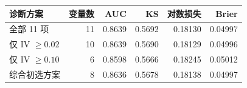 \begin{tabular}{lrrrrr}
\toprule
诊断方案 & 变量数 & AUC & KS & 对数损失 & Brier \\
\midrule
全部 11 项 & 11 & 0.8639 & 0.5692 & 0.18130 & 0.04997 \\
仅 IV $\geq0.02$ & 10 & 0.8639 & 0.5690 & 0.18129 & 0.04996 \\
仅 IV $\geq0.10$ & 6 & 0.8598 & 0.5666 & 0.18245 & 0.05012 \\
综合初选方案 & 8 & 0.8636 & 0.5678 & 0.18138 & 0.04997 \\
\bottomrule
\end{tabular}
